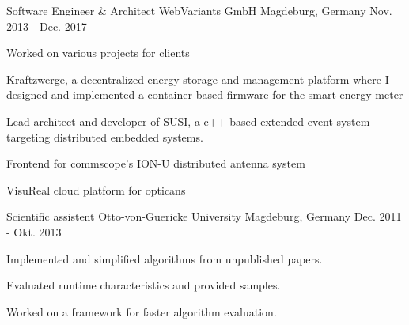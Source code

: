 \begin{cventries}

\cventry
{Software Engineer \& Architect} %
{WebVariants GmbH} %
{Magdeburg, Germany} %
{Nov. 2013 - Dec. 2017} %
{ %
\begin{cvitems}
\item {Worked on various projects for clients}
\item {Kraftzwerge, a decentralized energy storage and management platform where I designed and implemented a container based firmware for the smart energy meter}
\item {Lead architect and developer of SUSI, a c++ based extended event system targeting distributed embedded systems.}
\item {Frontend for commscope's ION-U distributed antenna system}
\item {VisuReal cloud platform for opticans}
\end{cvitems}
}


\cventry
{Scientific assistent} %
{Otto-von-Guericke University} %
{Magdeburg, Germany} %
{Dec. 2011 - Okt. 2013} %
{ %
\begin{cvitems}
\item {Implemented and simplified algorithms from unpublished papers.}
\item {Evaluated runtime characteristics and provided samples.}
\item {Worked on a framework for faster algorithm evaluation.}
\end{cvitems} 
}


\end{cventries}
